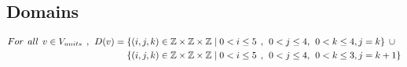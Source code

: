 \subsection{Domains}
\begin{align*}
For \hspace{1ex} all \hspace{1ex} v \in V_{units} \hspace{1ex},\hspace{1ex} D(v)=\{&(i,j,k) \in \mathbb{Z} \times \mathbb{Z}	\times \mathbb{Z} \mid  0<i \leq 5 \hspace{1ex} , \hspace{1ex} 0<j \leq 4,\hspace{1ex} 0<k \leq 4,j=k\} \hspace{1ex}\cup\\
\{&(i,j,k) \in \mathbb{Z} \times \mathbb{Z}	\times \mathbb{Z} \mid  0<i \leq 5 \hspace{1ex} , \hspace{1ex} 0<j \leq 4,\hspace{1ex} 0<k \leq 3,j=k+1\}
\end{align*}
